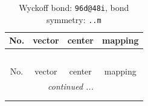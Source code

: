 \documentclass[fleqn,8pt]{jsarticle}
\begin{document}
\renewcommand{\arraystretch}{1.2}
\begin{longtable}{cccc}
\caption{Wyckoff bond: {\tt 96d@48i}, bond symmetry: {\tt ..m}}
 \\
 \hline \hline
No. & vector & center & mapping \\ \hline \endfirsthead

\multicolumn{3}{l}{\tablename\ \thetable{}} \\
 \hline \hline
No. & vector & center & mapping \\ \hline \endhead

 \hline \hline
\multicolumn{3}{r}{\footnotesize\it continued ...} \\ \endfoot

 \hline \hline
\multicolumn{3}{r}{} \\ \endlastfoot


\end{longtable}
\end{document}
